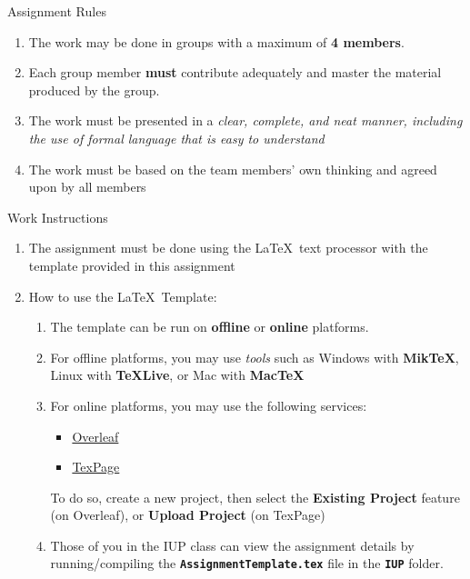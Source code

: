 \documentclass[a4paper,11pt]{article}
\newcommand{\tekskode}[1]{{\bf\large\texttt{#1}}}
\begin{document}
\begin{infobox}{Assignment Rules}
\begin{enumerate}
    \itemsep0em
     \item The work may be done in groups with a maximum of \textbf{4 members}.
     \item Each group member \textbf{must} contribute adequately and master the material produced by the group.
     \item The work must be presented in a \textit{clear, complete, and neat manner, including the use of formal language that is easy to understand}
     \item The work must be based on the team members' own thinking and agreed upon by all members
\end{enumerate}  
\end{infobox}
\begin{warnbox}{Work Instructions}
\begin{enumerate}
    \itemsep0em
    \item The assignment must be done using the \LaTeX\ text processor with the template provided in this assignment
    \item How to use the \LaTeX\ Template:
    \begin{enumerate}
    \itemsep0em
     \item The template can be run on \textbf{offline} or \textbf{online} platforms.
     \item For offline platforms, you may use \textit{tools} such as Windows with \textbf{MikTeX}, Linux with \textbf{TeXLive}, or Mac with \textbf{MacTeX}
     \item For online platforms, you may use the following services:
     \begin{itemize}
         \item \href{https://www.overleaf.com/}{Overleaf}
         \item \href{https://www.texpage.com/}{TexPage}
     \end{itemize}
     To do so, create a new project, then select the \textbf{Existing Project} feature (on Overleaf), or \textbf{Upload Project} (on TexPage)
     \item Those of you in the IUP class can view the assignment details by running/compiling the \tekskode{AssignmentTemplate.tex} file in the \tekskode{IUP} folder.
     

\end{enumerate}
\end{enumerate}
\end{warnbox}
\end{document}
